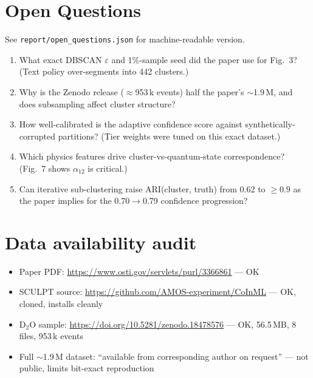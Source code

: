 \documentclass[11pt]{article}
\begin{document}
\section{Open Questions}
See \texttt{report/open\_questions.json} for machine-readable version.
\begin{enumerate}
\item[\textbf{Q1}] What exact DBSCAN $\varepsilon$ and 1\%-sample seed did the paper use for Fig.~3? (Text policy over-segments into 442 clusters.)
\item[\textbf{Q2}] Why is the Zenodo release ($\approx$953\,k events) half the paper's $\sim$1.9\,M, and does subsampling affect cluster structure?
\item[\textbf{Q3}] How well-calibrated is the adaptive confidence score against synthetically-corrupted partitions? (Tier weights were tuned on this exact dataset.)
\item[\textbf{Q4}] Which physics features drive cluster-vs-quantum-state correspondence? (Fig.~7 shows $\alpha_{12}$ is critical.)
\item[\textbf{Q5}] Can iterative sub-clustering raise ARI(cluster, truth) from 0.62 to $\geq 0.9$ as the paper implies for the 0.70$\to$0.79 confidence progression?
\end{enumerate}

\section*{Data availability audit}
\begin{itemize}
\item Paper PDF: \url{https://www.osti.gov/servlets/purl/3366861} --- OK
\item SCULPT source: \url{https://github.com/AMOS-experiment/CoInML} --- OK, cloned, installs cleanly
\item D$_2$O sample: \url{https://doi.org/10.5281/zenodo.18478576} --- OK, 56.5\,MB, 8 files, 953\,k events
\item Full $\sim$1.9\,M dataset: ``available from corresponding author on request'' --- not public, limits bit-exact reproduction
\end{itemize}
\end{document}
